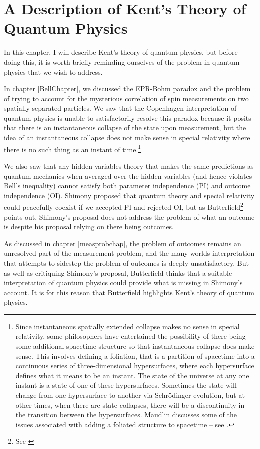 \chapter{A Description of Kent's Theory of Quantum Physics\label{kentchapterdesc}}

In this chapter, I will describe Kent's theory of quantum physics, but before doing this, it is worth briefly reminding ourselves of the problem in quantum physics that we wish to address. 

In chapter \ref{BellChapter}, we discussed the EPR-Bohm paradox and the problem of trying to account for the mysterious correlation of spin measurements on two spatially separated particles. We saw that the Copenhagen interpretation of quantum physics is unable to satisfactorily resolve this paradox because it posits that there is an instantaneous collapse of the state upon measurement, but the idea of an instantaneous collapse does not make sense in special relativity where there is no such thing as an instant of time.\footnote{Since instantaneous spatially extended collapse makes no sense in special relativity, some philosophers have entertained the possibility of there being some additional spacetime structure so that instantaneous collapse does make sense. This involves defining a foliation, that is a partition of spacetime into a continuous series of three-dimensional hypersurfaces, where each hypersurface defines what it means to be an instant. The state of the universe at any one instant is a state of one of these hypersurfaces. Sometimes the state will change from one hypersurface to another via Schr\"{o}dinger evolution, but at other times, when there are state collapses, there will be a discontinuity in the transition between the hypersurfaces. Maudlin discusses some of the issues associated with adding a foliated structure to spacetime -- see \cite{Maudlin3}.} 

We also saw that any hidden variables theory that makes the same predictions as quantum mechanics when averaged over the hidden variables (and hence violates Bell's inequality) cannot satisfy both  parameter independence (PI) and outcome independence (OI). Shimony proposed that quantum theory and special relativity could peacefully coexist if we accepted PI and rejected OI, but as Butterfield\footnote{See \cite{Butterfield}} points out, Shimony's proposal  does not address the problem of what an outcome is despite his proposal relying on there being outcomes. 

As discussed in chapter \ref{measprobchap}, the problem of outcomes remains an unresolved part of the measurement problem, and the many-worlds interpretation that attempts to sidestep the problem of outcomes is deeply unsatisfactory. But as well as critiquing Shimony's proposal, Butterfield thinks that a suitable interpretation of quantum physics could provide what is missing in Shimony's account. It is for this reason that Butterfield highlights Kent's theory of quantum physics.

